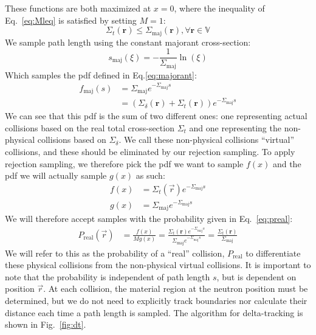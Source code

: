 These functions are both maximized at $x=0$, where the inequality of
Eq.~\eqref{eq:Mleq} is satisfied by setting $M=1$:
\begin{equation}
  \label{eq:cseq}
  \Sigma_t(\mathbf{r}) \leq \Sigma_\mathrm{maj}(\mathbf{r}), \forall
  \mathbf{r} \in \mathbb{V}
\end{equation}
We sample path length using the constant majorant
cross-section:
\begin{equation}
  \label{eq:majorantsample}
  s_\mathrm{maj}(\xi) = -\frac{1}{\Sigma_\mathrm{maj}}\ln(\xi)
\end{equation}
Which samples the \gls{pdf} defined in Eq.\eqref{eq:majorant}:
\begin{align*}
    f_\mathrm{maj}(s) &= \Sigma_\mathrm{maj}e^{-\Sigma_\mathrm{maj}s} \\
  & = (\Sigma_\delta(\mathbf{r}) +
    \Sigma_t(\mathbf{r}))e^{-\Sigma_\mathrm{maj}s}
\end{align*}
We can see that this \gls{pdf} is the sum of two different ones: one
representing actual collisions based on the real total cross-section
$\Sigma_t$ and one representing the non-physical collisions based on
$\Sigma_\delta$. We call these non-physical collisions ``virtual''
collisions, and these should be eliminated by our rejection
sampling. To apply rejection sampling, we therefore pick the \gls{pdf}
we want to sample $f(x)$ and the \gls{pdf} we will actually sample
$g(x)$ as such:
\begin{align*}
  f(x) &= \Sigma_t(\vec{r})e^{-\Sigma_\mathrm{maj}s} \\
  g(x) &= \Sigma_\mathrm{maj}e^{-\Sigma_\mathrm{maj}s}
\end{align*}
We will therefore accept samples with the probability given
in Eq.~\eqref{eq:preal}:
\begin{align}
  \label{eq:prealfinal}
  P_{\mathrm{real}}(\vec{r}) &= \frac{f(x)}{Mg(x)} =
      \frac{\Sigma_t(\mathbf{r})e^{-\Sigma_\mathrm{maj}s}}{\Sigma_\mathrm{maj}e^{-\Sigma_\mathrm{maj}s}}
  = \frac{\Sigma_t(\mathbf{r})}{\Sigma_\mathrm{maj}}
\end{align}
We will refer to this as the probability of a ``real'' collision,
$P_\mathrm{real}$ to differentiate these physical collisions from the
non-physical virtual collisions. It is important to note that the
probability is independent of path length $s$, but is dependent on
position $\vec{r}$. At each collision, the material region at the
neutron position must be determined, but we do not need to explicitly
track boundaries nor calculate their distance each time a path length
is sampled. The algorithm for delta-tracking is shown in
Fig.~\ref{fig:dt}.

